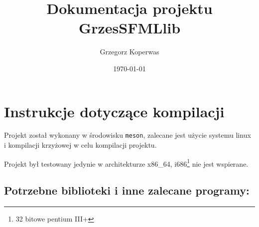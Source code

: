 \documentclass[a4paper,11pt]{article}
\title{Dokumentacja projektu GrzesSFMLlib}
\author{Grzegorz Koperwas}
\date{\today}
\begin{document}
\begin{flushright}
    \LARGE{\thetitle}

    \Large{\theauthor}

    \thedate
\end{flushright}

\section{Instrukcje dotyczące kompilacji}

Projekt został wykonany w środowisku \texttt{meson}, zalecane jest użycie systemu linux i kompilacji krzyżowej w celu kompilacji projektu.

Projekt był testowany jedynie w architekturze x86\_64, i686\footnote{32 bitowe pentium III+} nie jest wspierane.


\subsection*{Potrzebne biblioteki i inne zalecane programy:}
\end{document}
